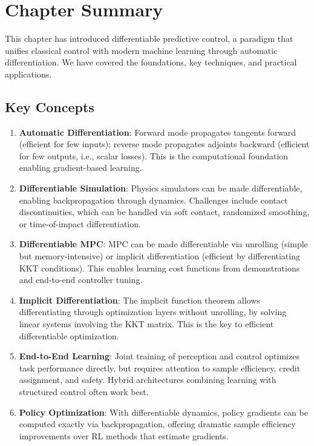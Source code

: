 \section{Chapter Summary}
\label{sec:summary}

This chapter has introduced differentiable predictive control, a paradigm that unifies classical control with modern machine learning through automatic differentiation. We have covered the foundations, key techniques, and practical applications.

\subsection{Key Concepts}

\begin{enumerate}
    \item \textbf{Automatic Differentiation}: Forward mode propagates tangents forward (efficient for few inputs); reverse mode propagates adjoints backward (efficient for few outputs, i.e., scalar losses). This is the computational foundation enabling gradient-based learning.

    \item \textbf{Differentiable Simulation}: Physics simulators can be made differentiable, enabling backpropagation through dynamics. Challenges include contact discontinuities, which can be handled via soft contact, randomized smoothing, or time-of-impact differentiation.

    \item \textbf{Differentiable MPC}: MPC can be made differentiable via unrolling (simple but memory-intensive) or implicit differentiation (efficient by differentiating KKT conditions). This enables learning cost functions from demonstrations and end-to-end controller tuning.

    \item \textbf{Implicit Differentiation}: The implicit function theorem allows differentiating through optimization layers without unrolling, by solving linear systems involving the KKT matrix. This is the key to efficient differentiable optimization.

    \item \textbf{End-to-End Learning}: Joint training of perception and control optimizes task performance directly, but requires attention to sample efficiency, credit assignment, and safety. Hybrid architectures combining learning with structured control often work best.

    \item \textbf{Policy Optimization}: With differentiable dynamics, policy gradients can be computed exactly via backpropagation, offering dramatic sample efficiency improvements over RL methods that estimate gradients.
\end{enumerate}

